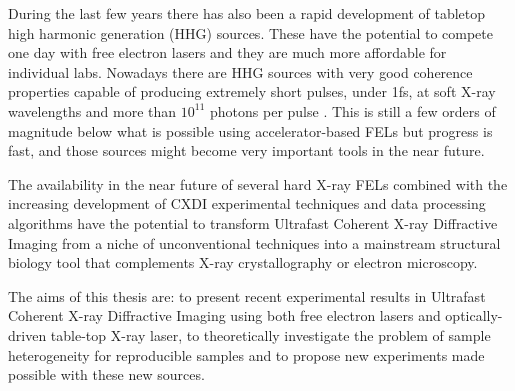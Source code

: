 During the last few years there has also been a rapid development of tabletop
high harmonic generation (HHG) sources. These have the potential to compete one
day with free electron lasers and they are much more affordable for
individual labs. Nowadays there are HHG sources with very good coherence
properties capable of producing extremely short pulses, under 1fs, at soft X-ray wavelengths and more than $10^{11}$ photons
per pulse \cite{Ravasio2009SingleShot}. This is still a few orders of magnitude below what is
possible using accelerator-based FELs but progress is fast, and those sources
might
become very important tools in the near future.

The availability in the near future of several hard X-ray FELs combined with the
increasing development of CXDI experimental techniques and data processing
algorithms have the potential to transform Ultrafast Coherent X-ray Diffractive
Imaging from a niche of unconventional techniques into a mainstream structural
biology tool that complements X-ray crystallography or electron microscopy.


The aims of this thesis are: to present recent experimental results in Ultrafast
Coherent X-ray Diffractive Imaging using both free electron lasers and
optically-driven table-top X-ray laser, to theoretically investigate the problem of sample heterogeneity
for reproducible samples and to propose new experiments made possible with these
new sources.
